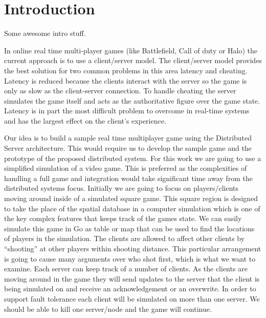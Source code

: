 
\section{Introduction}
\label{sec:Intro}

Some awesome intro stuff.

In online real time multi-player games (like Battlefield, Call of duty or Halo) the current approach is to use a client/server model. The client/server model provides the best solution for two common problems in this area latency and cheating. Latency is reduced because the clients interact with the server so the game is only as slow as the client-server connection. To handle cheating the server simulates the game itself and acts as the authoritative figure over the game state. Latency is in part the most difficult problem to overcome in real-time systems and has the largest effect on the client’s experience.

Our idea is to build a sample real time multiplayer game using the Distributed Server architecture. This would require us to develop the sample game and the prototype of the proposed distributed system. 
For this work we are going to use a simplified simulation of a video game. This is preferred as the complexities of handling a full game and integration would take significant time away from the distributed systems focus. Initially we are going to focus on players/clients moving around inside of a simulated square game. This square region is designed to take the place of the spatial database in a computer simulation which is one of the key complex features that keeps track of the games state. We can easily simulate this game in Go as table or map that can be used to find the locations of players in the simulation. The clients are allowed to affect other clients by “shooting” at other players within shooting distance. This particular arrangement is going to cause many arguments over who shot first, which is what we want to examine.
Each server can keep track of a number of clients. As the clients are moving around in the game they will send updates to the server that the client is being simulated on  and receive an acknowledgement or an overwrite. In order to support fault tolerance each client will be simulated on more than one server. We should be able to kill one server/node and the game will continue.

